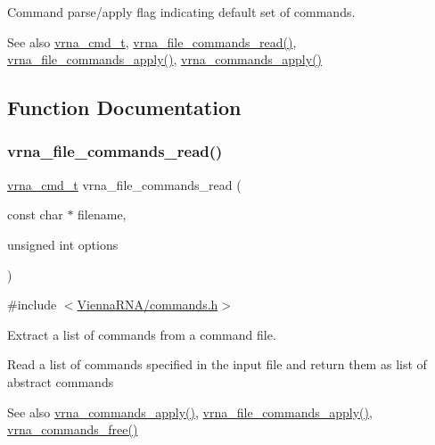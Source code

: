 Command parse/apply flag indicating default set of commands. 

\begin{DoxySeeAlso}{See also}
\hyperlink{group__command__files_gaf31afe4c5f8e4bf44a670ab4c3dcd916}{vrna\+\_\+cmd\+\_\+t}, \hyperlink{group__command__files_gae5f56400ed43683338f7bf1c1102655a}{vrna\+\_\+file\+\_\+commands\+\_\+read()}, \hyperlink{group__command__files_gadbe8c9622f7bcc6dcbe3448b98df8656}{vrna\+\_\+file\+\_\+commands\+\_\+apply()}, \hyperlink{group__command__files_gac65d0fe86f7671a2d2b85dda1a3ddc16}{vrna\+\_\+commands\+\_\+apply()} 
\end{DoxySeeAlso}


\subsection{Function Documentation}
\mbox{\label{group__command__files_gae5f56400ed43683338f7bf1c1102655a}} 
\subsubsection{\texorpdfstring{vrna\+\_\+file\+\_\+commands\+\_\+read()}{vrna\_file\_commands\_read()}}
{\footnotesize\ttfamily \hyperlink{group__command__files_gaf31afe4c5f8e4bf44a670ab4c3dcd916}{vrna\+\_\+cmd\+\_\+t} vrna\+\_\+file\+\_\+commands\+\_\+read (\begin{DoxyParamCaption}\item[{const char $\ast$}]{filename,  }\item[{unsigned int}]{options }\end{DoxyParamCaption})}



{\ttfamily \#include $<$\hyperlink{commands_8h}{Vienna\+R\+N\+A/commands.\+h}$>$}



Extract a list of commands from a command file. 

Read a list of commands specified in the input file and return them as list of abstract commands

\begin{DoxySeeAlso}{See also}
\hyperlink{group__command__files_gac65d0fe86f7671a2d2b85dda1a3ddc16}{vrna\+\_\+commands\+\_\+apply()}, \hyperlink{group__command__files_gadbe8c9622f7bcc6dcbe3448b98df8656}{vrna\+\_\+file\+\_\+commands\+\_\+apply()}, \hyperlink{group__command__files_ga3dc372dcbb43d2c4c91b5ef79b460428}{vrna\+\_\+commands\+\_\+free()}
\end{DoxySeeAlso}

